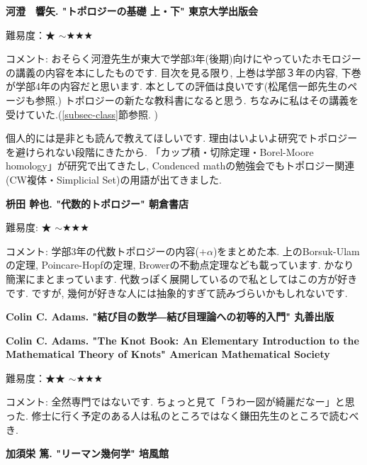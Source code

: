 \textbf{河澄　響矢. "トポロジーの基礎 上・下" 東京大学出版会}  　\vspace{-6pt} 

難易度：★ $\sim$★★★\vspace{-6pt} 

コメント: おそらく河澄先生が東大で学部3年(後期)向けにやっていたホモロジーの講義の内容を本にしたものです. 目次を見る限り, 上巻は学部３年の内容, 下巻が学部4年の内容だと思います. 本としての評価は良いです(松尾信一郎先生のページも参照.) トポロジーの新たな教科書になると思う. ちなみに私はその講義を受けていた.(\ref{subsec-class}節参照. )

個人的には是非とも読んで教えてほしいです. 理由はいよいよ研究でトポロジーを避けられない段階にきたから. 「カップ積・切除定理・Borel-Moore homology」が研究で出てきたし, Condenced mathの勉強会でもトポロジー関連(CW複体・Simplicial Set)の用語が出てきました. 
\vspace{8pt}

\textbf{枡田 幹也. "代数的トポロジー" 朝倉書店}  　\vspace{-6pt} 

難易度: ★ $\sim$★★★\vspace{-6pt} 

コメント: 学部3年の代数トポロジーの内容(+$\alpha$)をまとめた本. 上のBorsuk-Ulamの定理, Poincare-Hopfの定理, Browerの不動点定理なども載っています. かなり簡潔にまとまっています. 代数っぽく展開しているので私としてはこの方が好きです.  ですが, 幾何が好きな人には抽象的すぎて読みづらいかもしれないです. 
\vspace{8pt}


\textbf{Colin C. Adams. "結び目の数学―結び目理論への初等的入門" 丸善出版}  　\vspace{-6pt} 

\textbf{Colin C. Adams. "The Knot Book: An Elementary Introduction to the Mathematical Theory of Knots" American Mathematical Society}  　\vspace{-6pt} 

難易度：★★ $\sim$★★★\vspace{-6pt} 

コメント: 全然専門ではないです. ちょっと見て「うわー図が綺麗だなー」と思った. 修士に行く予定のある人は私のところではなく鎌田先生のところで読むべき. 
\vspace{8pt}

\textbf{加須栄 篤. "リーマン幾何学" 培風館}  　\vspace{-6pt} 


